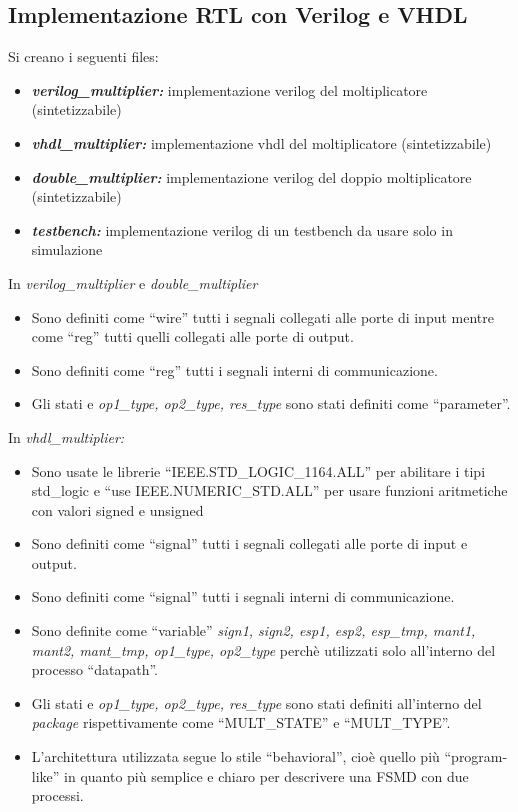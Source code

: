 \documentclass[]{IEEEtran}
\begin{document}
\subsection{Implementazione RTL con Verilog e VHDL}
Si creano i seguenti files:
\begin{itemize}
\item {\it\bf verilog\_multiplier:} implementazione verilog del moltiplicatore (sintetizzabile)
\item {\it\bf vhdl\_multiplier:} implementazione vhdl del moltiplicatore (sintetizzabile)
\item {\it\bf double\_multiplier:} implementazione verilog del doppio moltiplicatore (sintetizzabile)
\item {\it\bf testbench:} implementazione verilog di un testbench da usare solo in simulazione
\end{itemize}
In {\it verilog\_multiplier} e {\it double\_multiplier}
\begin{itemize}
\item Sono definiti come ``wire'' tutti i segnali collegati alle porte di input mentre come ``reg'' tutti quelli collegati alle porte di output.
\item Sono definiti come ``reg'' tutti i segnali interni di communicazione.
\item Gli stati e {\it op1\_type, op2\_type, res\_type} sono stati definiti come ``parameter''.
\end{itemize}
In {\it vhdl\_multiplier:}
\begin{itemize}
\item Sono usate le librerie ``IEEE.STD\_LOGIC\_1164.ALL'' per abilitare i tipi std\_logic e ``use IEEE.NUMERIC\_STD.ALL'' per usare funzioni aritmetiche con valori signed e unsigned
\item Sono definiti come ``signal'' tutti i segnali collegati alle porte di input e output.
\item Sono definiti come ``signal'' tutti i segnali interni di communicazione.
\item Sono definite come ``variable'' {\it sign1, sign2, esp1, esp2, esp\_tmp, mant1, mant2, mant\_tmp, op1\_type, op2\_type} perchè utilizzati solo all'interno del processo ``datapath''.
\item Gli stati e {\it op1\_type, op2\_type, res\_type} sono stati definiti all'interno del {\it package} rispettivamente come ``MULT\_STATE'' e ``MULT\_TYPE''.
\item L'architettura utilizzata segue lo stile ``behavioral'', cioè quello più ``program-like'' in quanto più semplice e chiaro per descrivere una FSMD con due processi.
\end{itemize}
\end{document}
